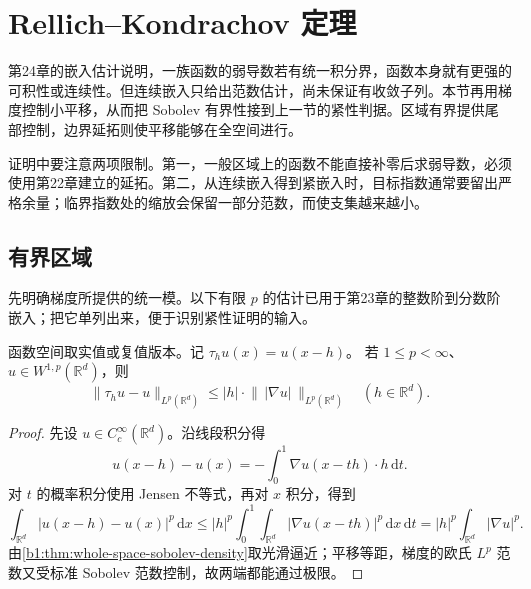 \section{Rellich–Kondrachov 定理}
\label{b1:sec:2502}

第24章的嵌入估计说明，一族函数的弱导数若有统一积分界，函数本身就有更强的可积性或连续性。但连续嵌入只给出范数估计，尚未保证有收敛子列。本节再用梯度控制小平移，从而把 Sobolev 有界性接到上一节的紧性判据。区域有界提供尾部控制，边界延拓则使平移能够在全空间进行。

\ProseParagraphBreak

证明中要注意两项限制。第一，一般区域上的函数不能直接补零后求弱导数，必须使用第22章建立的延拓。第二，从连续嵌入得到紧嵌入时，目标指数通常要留出严格余量；临界指数处的缩放会保留一部分范数，而使支集越来越小。

\subsection{有界区域}
\label{b1:subsec:250201}

先明确梯度所提供的统一模。以下有限 \(p\) 的估计已用于第23章的整数阶到分数阶嵌入；把它单列出来，便于识别紧性证明的输入。

\begin{lemma}\label{b1:lem:sobolev-translation-gradient}
函数空间取实值或复值版本。记 \(\tau_hu(x)=u(x-h)\)。
若 \(1\le p<\infty\)、\(u\in W^{1,p}(\mathbb R^d)\)，则
\begin{equation}\label{b1:eq:sobolev-translation-gradient}
 \|\tau_hu-u\|_{L^p(\mathbb R^d)}
 \le |h|\cdot\bigl\|\,|\nabla u|\,\bigr\|_{L^p(\mathbb R^d)}
 \quad(h\in\mathbb R^d).
\end{equation}
\end{lemma}
\begin{proof}
先设 \(u\in C_c^\infty(\mathbb R^d)\)。沿线段积分得
\[
 u(x-h)-u(x)=-\int_0^1\nabla u(x-th)\cdot h\,\mathrm dt.
\]
对 \(t\) 的概率积分使用 Jensen 不等式，再对 \(x\) 积分，得到
\[
 \int_{\mathbb R^d}|u(x-h)-u(x)|^p\,\mathrm dx
 \le |h|^p\int_0^1\int_{\mathbb R^d}|\nabla u(x-th)|^p
                \,\mathrm dx\,\mathrm dt
 =|h|^p\int_{\mathbb R^d}|\nabla u|^p.
\]
由\cref{b1:thm:whole-space-sobolev-density}取光滑逼近；平移等距，梯度的欧氏 \(L^p\) 范数又受标准 Sobolev 范数控制，故两端都能通过极限。
\end{proof}

